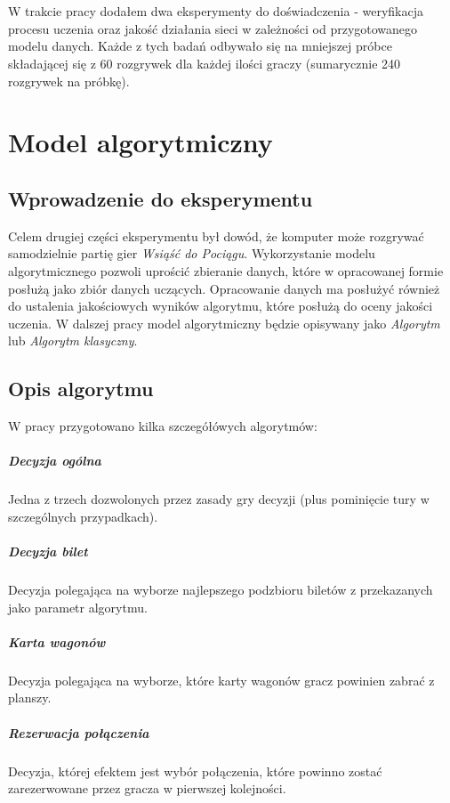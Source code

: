 \documentclass[12pt, oneside]{report}
\begin{document}
\\ \\ W trakcie pracy dodałem dwa eksperymenty do doświadczenia - weryfikacja procesu uczenia oraz jakość działania sieci w zależności od przygotowanego modelu danych. Każde z tych badań odbywało się na mniejszej próbce składającej się z 60 rozgrywek dla każdej ilości graczy (sumarycznie 240 rozgrywek na próbkę).

\chapter{Model algorytmiczny}
\label{model:algo}
\section{Wprowadzenie do eksperymentu}
Celem drugiej części eksperymentu był dowód, że komputer może rozgrywać samodzielnie partię gier \textit{Wsiąść do Pociągu}. Wykorzystanie modelu algorytmicznego pozwoli uprościć zbieranie danych, które w opracowanej formie posłużą jako zbiór danych uczących. Opracowanie danych ma posłużyć również do ustalenia jakościowych wyników algorytmu, które posłużą do oceny jakości uczenia. W dalszej pracy model algorytmiczny będzie opisywany jako \textit{Algorytm} lub \textit{Algorytm klasyczny}.
\section{Opis algorytmu}
W pracy przygotowano kilka szczegółówych algorytmów:
\paragraph{Decyzja ogólna} Jedna z trzech dozwolonych przez zasady gry decyzji (plus pominięcie tury w szczególnych przypadkach).
\paragraph{Decyzja bilet} Decyzja polegająca na wyborze najlepszego podzbioru biletów z przekazanych jako parametr algorytmu.
\paragraph{Karta wagonów} Decyzja polegająca na wyborze, które karty wagonów gracz powinien zabrać z planszy.
\paragraph{Rezerwacja połączenia} Decyzja, której efektem jest wybór połączenia, które powinno zostać zarezerwowane przez gracza w pierwszej kolejności.
\end{document}
